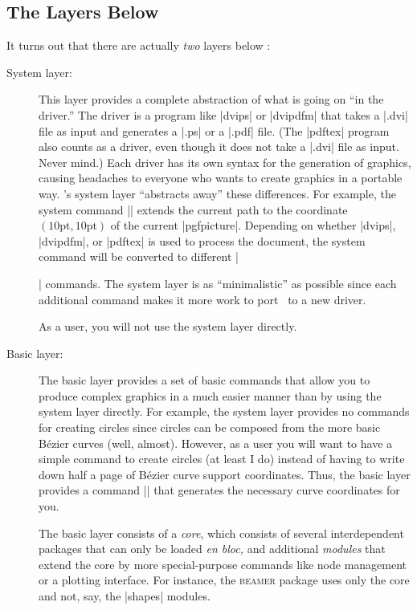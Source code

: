 \subsection{The Layers Below \tikzname}

It turns out that there are actually \emph{two} layers below \tikzname:

\begin{description}
\item[System layer:] This layer provides a complete abstraction of what is
  going on ``in the driver.'' The driver is a program like |dvips| or
  |dvipdfm| that takes a |.dvi| file as input and generates a |.ps| or
  a |.pdf| file. (The |pdftex| program also counts as a driver, even
  though it does not take a |.dvi| file as input. Never mind.) Each
  driver has its own syntax for the generation of graphics, causing
  headaches to everyone who wants to create graphics in a portable
  way. \pgfname's system layer ``abstracts away'' these
  differences. For example, the system command
  |\pgfsys@lineto{10pt}{10pt}| extends the current path  to the coordinate
  $(10\mathrm{pt},10\mathrm{pt})$ of the current
  |{pgfpicture}|. Depending on whether |dvips|,
  |dvipdfm|, or |pdftex| is used to process the document, the system
  command will be converted to different |\special| commands.
  The system layer is as ``minimalistic'' as possible since each
  additional command makes it more work to port \pgfname\ to a new
  driver.

  As a user, you will not use the system layer directly.
\item[Basic layer:]
  The basic layer provides a set of basic commands that allow
  you to produce complex graphics in a much easier manner than by using
  the system layer directly. For example,  the system layer provides
  no commands for creating circles since circles can be composed from
  the more basic B\'ezier curves (well, almost). However, as a user you
  will want to have a simple command to create circles
  (at least I do) instead of having to write down half a page of
  B\'ezier curve support coordinates. Thus, the basic layer provides a
  command |\pgfpathcircle| that generates the necessary curve
  coordinates for you.

  The basic layer consists of a \emph{core}, which consists of
  several interdependent packages that can only be loaded \emph{en
    bloc,} and additional \emph{modules} that extend the core by more
  special-purpose commands like node management or a plotting
  interface. For instance, the \textsc{beamer} package uses only the
  core and not, say, the |shapes| modules.
\end{description}  

